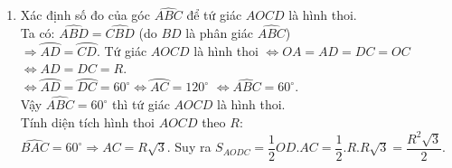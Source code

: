 \begin{ex}
{\begin{enumerate}
        $\widehat{ADB}=90^\circ$ (góc nội tiếp chắn nửa đường tròn $(O)$, $\Rightarrow AD \perp BE$.\\
        $\triangle EAB$ vuông ở $A$  có  $AD\perp BE$  nên: ${AB}^2 = BD. BE$, $(1)$.\\
        $\widehat{ACB}=90^\circ$ (góc nội tiếp chắn nửa đường tròn $(O)$ $\Rightarrow AC\perp BF$.\\
        $\triangle FAB$ vuông ở $A$ có $AC \perp BF$ nên   ${AB}^2 = BC. BF$, $(2)$.\\
        Từ (1) và (2) suy ra: $BD. BE = BC. BF$.
        (Cách khác: chứng minh $\triangle BCD\backsim\triangle BEF$)
        \item Xác định số đo của góc $\widehat{ABC}$ để tứ giác $AOCD$ là hình thoi.\\
        Ta có: $\widehat{ABD}=\widehat{CBD}$ (do $BD$ là phân giác $\widehat{ABC}$)\\ $\Rightarrow  \wideparen{AD}= \wideparen{CD}$.
        Tứ giác $AOCD$ là hình thoi $\Leftrightarrow OA = AD = DC = OC$
        $\Leftrightarrow AD = DC =  R$.\\
        $\Leftrightarrow  \wideparen{AD}= \wideparen{DC}={60}^\circ \Leftrightarrow  \wideparen{AC}={120}^\circ$ $\Leftrightarrow \widehat{ABC}=60^\circ$.\\
        Vậy $\widehat{ABC}=60^\circ$ thì tứ giác $AOCD$ là hình thoi.\\
        Tính diện tích hình thoi $AOCD$ theo $R$:\\
        $\widehat{BAC}={60}^\circ \Rightarrow AC=R \sqrt{3}$.  Suy ra
        $S_{AODC}=\dfrac{1}{2} OD. AC=\dfrac{1}{2}. R. R\sqrt{3}=\dfrac{R^2\sqrt{3}}{2}$.
    \end{enumerate}
    }
\end{ex}
